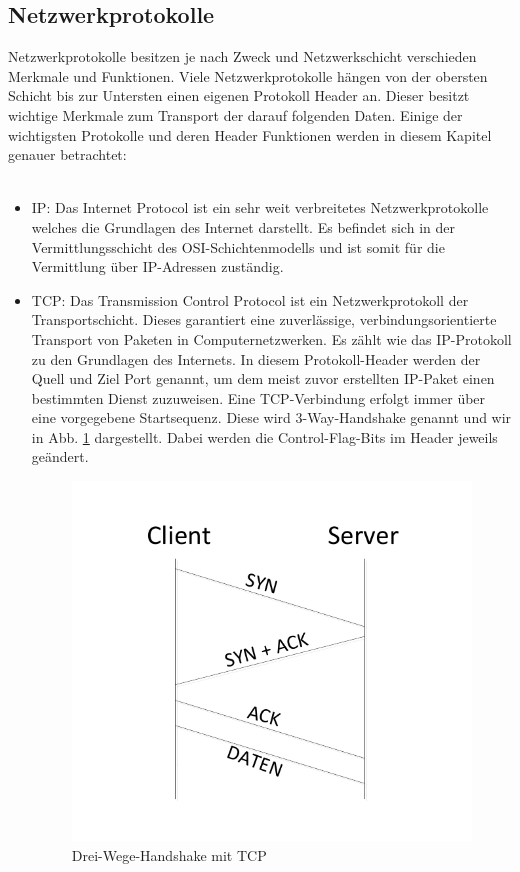 \subsection{Netzwerkprotokolle}
Netzwerkprotokolle besitzen je nach Zweck und Netzwerkschicht verschieden Merkmale und Funktionen. Viele Netzwerkprotokolle hängen von der obersten Schicht bis zur Untersten einen eigenen Protokoll Header an. Dieser besitzt wichtige Merkmale zum Transport der darauf folgenden Daten. Einige der wichtigsten Protokolle und deren Header Funktionen werden in diesem Kapitel genauer betrachtet:\\
\\
\begin{itemize}
\item IP: Das Internet Protocol ist ein sehr weit verbreitetes Netzwerkprotokolle welches die Grundlagen des Internet darstellt. Es befindet sich in der Vermittlungsschicht des OSI-Schichtenmodells und ist somit für die Vermittlung über IP-Adressen zuständig.  
\item TCP: Das Transmission Control Protocol ist ein Netzwerkprotokoll der Transportschicht. Dieses garantiert eine zuverlässige, verbindungsorientierte Transport von Paketen in Computernetzwerken. Es zählt wie das IP-Protokoll zu den Grundlagen des Internets. In diesem Protokoll-Header werden der Quell und Ziel Port genannt, um dem meist zuvor erstellten IP-Paket einen bestimmten Dienst zuzuweisen. Eine TCP-Verbindung erfolgt immer über eine vorgegebene Startsequenz. Diese wird 3-Way-Handshake genannt und wir in Abb. \ref{3way} dargestellt. Dabei werden die Control-Flag-Bits im Header jeweils geändert. 

\begin{figure}[h]
    \centering\includegraphics[scale=0.7]{Bilder/3way.pdf}
  \caption{Drei-Wege-Handshake mit TCP}
  \label{3way}
\end{figure}


\end{itemize}
